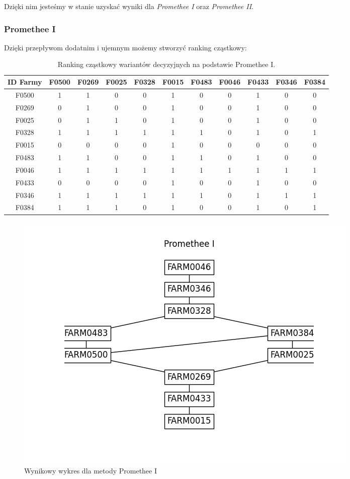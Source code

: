 \documentclass[11pt]{article}
\begin{document}
Dzięki nim jesteśmy w stanie uzyskać wyniki dla \textit{Promethee I} oraz \textit{Promethee II}.
\subsubsection{Promethee I}
Dzięki przepływom dodatnim i ujemnym możemy stworzyć ranking cząstkowy:
\begin{table}[H]
\centering
\begin{tabular}{|c||c|c|c|c|c|c|c|c|c|c|}
\hline
\textbf{ID Farmy} & \textbf{F0500} & \textbf{F0269} & \textbf{F0025} & \textbf{F0328} & \textbf{F0015} & \textbf{F0483} & \textbf{F0046} & \textbf{F0433} & \textbf{F0346} & \textbf{F0384} \\
\hline
F0500 & 1 & 1 & 0 & 0 & 1 & 0 & 0 & 1 & 0 & 0 \\
\hline
F0269 & 0 & 1 & 0 & 0 & 1 & 0 & 0 & 1 & 0 & 0 \\
\hline
F0025 & 0 & 1 & 1 & 0 & 1 & 0 & 0 & 1 & 0 & 0 \\
\hline
F0328 & 1 & 1 & 1 & 1 & 1 & 1 & 0 & 1 & 0 & 1 \\
\hline
F0015 & 0 & 0 & 0 & 0 & 1 & 0 & 0 & 0 & 0 & 0 \\
\hline
F0483 & 1 & 1 & 0 & 0 & 1 & 1 & 0 & 1 & 0 & 0 \\
\hline
F0046 & 1 & 1 & 1 & 1 & 1 & 1 & 1 & 1 & 1 & 1 \\
\hline
F0433 & 0 & 0 & 0 & 0 & 1 & 0 & 0 & 1 & 0 & 0 \\
\hline
F0346 & 1 & 1 & 1 & 1 & 1 & 1 & 0 & 1 & 1 & 1 \\
\hline
F0384 & 1 & 1 & 1 & 0 & 1 & 0 & 0 & 1 & 0 & 1 \\
\hline
\end{tabular}
\caption{Ranking cząstkowy wariantów decyzyjnych na podstawie Promethee I.}
\end{table}

\begin{figure}[H]
	\centering
	\includegraphics[scale=0.75]{output/Promethee I.png}
	\caption{Wynikowy wykres dla metody Promethee I}
\end{figure}
\end{document}

